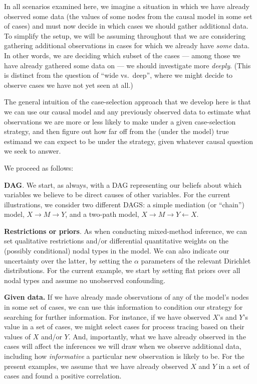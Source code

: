\documentclass[
  12pt,
]{book}
\begin{document}
In all scenarios examined here, we imagine a situation in which we have already observed some data (the values of some nodes from the causal model in some set of cases) and must now decide in which cases we should gather additional data. To simplify the setup, we will be assuming throughout that we are considering gathering additional observations in cases for which we already have \emph{some} data. In other words, we are deciding which subset of the cases --- among those we have already gathered some data on --- we should investigate more \emph{deeply}. (This is distinct from the question of ``wide vs.~deep'', where we might decide to observe cases we have not yet seen at all.)

The general intuition of the case-selection approach that we develop here is that we can use our causal model and any previously observed data to estimate what observations we are more or less likely to make under a given case-selection strategy, and then figure out how far off from the (under the model) true estimand we can expect to be under the strategy, given whatever causal question we seek to answer.

We proceed as follows:

\textbf{DAG}. We start, as always, with a DAG representing our beliefs about which variables we believe to be direct causes of other variables. For the current illustrations, we consider two different DAGS: a simple mediation (or ``chain'') model, \(X \rightarrow M \rightarrow Y\), and a two-path model, \(X \rightarrow M \rightarrow Y \leftarrow X\).

\textbf{Restrictions or priors}. As when conducting mixed-method inference, we can set qualitative restrictions and/or differential quantitative weights on the (possibly conditional) nodal types in the model. We can also indicate our uncertainty over the latter, by setting the \(\alpha\) parameters of the relevant Dirichlet distributions. For the current example, we start by setting flat priors over all nodal types and assume no unobserved confounding.

\textbf{Given data.} If we have already made observations of any of the model's nodes in some set of cases, we can use this information to condition our strategy for searching for further information. For instance, if we have observed \(X\)'s and \(Y\)'s value in a set of cases, we might select cases for process tracing based on their values of \(X\) and/or \(Y\). And, importantly, what we have already observed in the cases will affect the inferences we will draw when we observe additional data, including how \emph{informative} a particular new observation is likely to be. For the present examples, we assume that we have already observed \(X\) and \(Y\) in a set of cases and found a positive correlation.
\end{document}
